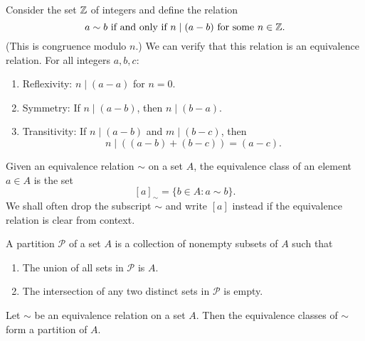\begin{example}
    Consider the set \(\mathbb{Z}\) of integers and define the relation
    \[
        a \sim b \text{ if and only if } n \mid (a - b) \text{ for some } n \in \mathbb{Z}.
    \]
    (This is congruence modulo \(n\).) We can verify that this relation is an
    equivalence relation. For all integers \(a, b, c\):
    \begin{enumerate}[label=(\alph*), itemsep=0pt, wide]
        \item Reflexivity: \(n \mid (a - a)\) for \(n = 0\).
        \item Symmetry: If \(n \mid (a - b)\), then \(n \mid (b - a)\).
        \item Transitivity: If \(n \mid (a - b)\) and \(m \mid (b - c)\), then
        \[n \mid ((a - b) + (b - c)) = (a - c).\]
    \end{enumerate}
\end{example}

\begin{definition}
    Given an equivalence relation \(\sim\) on a set \(A\), the equivalence class
    of an element \(a \in A\) is the set
    \[
        [a]_{\sim} = \{b \in A : a \sim b\}.
    \]
    We shall often drop the subscript \(\sim\) and write \([a]\) instead if the
    equivalence relation is clear from context.
\end{definition}

\begin{definition}
    A partition \(\mathcal{P}\) of a set \(A\) is a collection of nonempty
    subsets of \(A\) such that
    \begin{enumerate}[label=(\alph*)]
        \item The union of all sets in \(\mathcal{P}\) is \(A\).
        \item The intersection of any two distinct sets in \(\mathcal{P}\) is
        empty.
    \end{enumerate}
\end{definition}

\begin{theorem}
    Let \(\sim\) be an equivalence relation on a set \(A\). Then the equivalence
    classes of \(\sim\) form a partition of \(A\).
\end{theorem}

